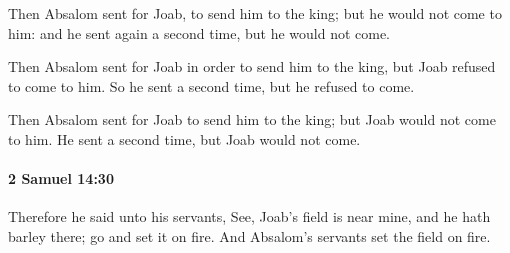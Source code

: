			\begin{versebox}
					\item[BHS] 
					\item[ASV] Then Absalom sent for Joab, to send him to the king; but he would not come to him: and he sent again a second time, but he would not come.
					\item[NIV] Then Absalom sent for Joab in order to send him to the king, but Joab refused to come to him. So he sent a second time, but he refused to come.
					\item[NRSV] Then Absalom sent for Joab to send him to the king; but Joab would not come to him. He sent a second time, but Joab would not come.
			\end{versebox}

		\paragraph{2 Samuel 14:30} %
			\label{2SAMUEL-14-30}

			Therefore he said unto his servants, See, Joab’s field is near mine, and he hath barley there; go and set it on fire. And Absalom’s servants set the field on fire.

